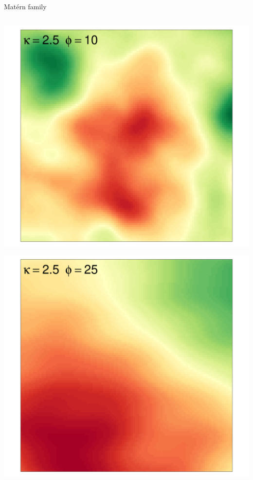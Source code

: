 \documentclass[
  ignorenonframetext,
]{beamer}
\begin{document}
\begin{frame}{Matérn family}
\begin{columns}[T]
\begin{column}{0.33\textwidth}
\includegraphics{Lecture_1_files/figure-beamer/unnamed-chunk-41-1.pdf}

\includegraphics{Lecture_1_files/figure-beamer/unnamed-chunk-42-1.pdf}
\end{column}


\end{columns}
\end{frame}
\end{document}
